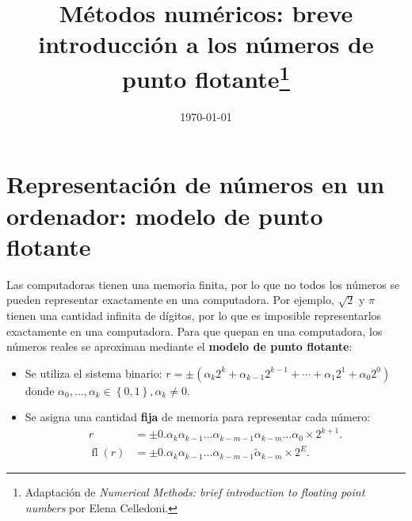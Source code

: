 \documentclass[a4paper,10pt]{scrartcl}
\title{
    Métodos numéricos:
    breve introducción a los números de punto flotante\thanks{
    Adaptación de
    \emph{Numerical Methods: brief introduction to floating point numbers}
    por Elena Celledoni.}
}
\author{\scshape\name}
\date{\today}
\theoremstyle{definition}
\begin{document}
\maketitle

\section{Representación de números en un ordenador: modelo de punto flotante}

Las computadoras tienen una memoria finita, por lo que no todos los
números se pueden representar exactamente en una computadora.
Por ejemplo, $\sqrt{2}$ y $\pi$ tienen una cantidad infinita de
dígitos, por lo que es imposible representarlos exactamente en una
computadora.
Para que quepan en una computadora, los números reales se aproximan
mediante el \textbf{modelo de punto flotante}:

\begin{itemize}
    \item

          Se utiliza el sistema binario:
          \begin{math}
              r=\pm
              \left(
              \alpha_{k}2^{k}+
              \alpha_{k-1}2^{k-1}+
              \cdots+
              \alpha_{1}2^{1}+
              \alpha_{0}2^{0}
              \right)
          \end{math}
          donde
          \begin{math}
              \alpha_{0},\dotsc,\alpha_{k}\in
              \left\{0,1\right\},
              \alpha_{k}\neq 0.
          \end{math}

    \item

          Se asigna una cantidad \textbf{fija} de memoria para
          representar cada número:
          \begin{align*}
              r
               & =\pm
              0.
              \alpha_{k}\alpha_{k-1}\dotsc
              \alpha_{k-m-1}\alpha_{k-m}\dotsc
              \alpha_{0}\times 2^{k+1}. \\
              \operatorname{fl}
              \left(r\right)
               & =\pm
              0.
              \alpha_{k}\alpha_{k-1}\dotsc
              \alpha_{k-m-1}\widetilde{\alpha}_{k-m}\times
              2^{E}.
          \end{align*}
\end{itemize}
\end{document}
